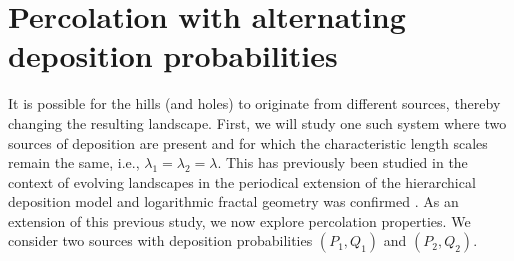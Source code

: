 \documentclass[amsmath,amssymb,amsfonts,aps,pre,preprint,superscriptaddress,bibnotes,showpacs,showkeys,longbibliography,nofootinbib]{revtex4-1}
\begin{document}
\section{Percolation with alternating deposition probabilities}\label{sec:percolation_alternating_prob}      
It is possible for the hills (and holes) to originate from different sources, thereby changing the resulting landscape. First, we will study one such system where two sources of deposition are present and for which the characteristic length scales remain the same, i.e., $\lambda_1=\lambda_2 =\lambda$. This has previously been studied in the context of evolving landscapes in the periodical extension of the hierarchical deposition model and logarithmic fractal geometry was confirmed  \cite{POSAZHENNIKOVA2000}. As an extension of this previous study, we now explore percolation properties. We consider two sources with deposition probabilities $(P_1,Q_1)$ and $(P_2,Q_2)$.
\end{document}
